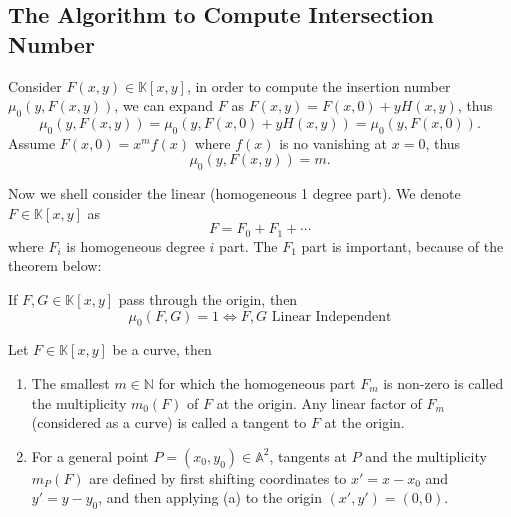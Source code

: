 \documentclass[10pt]{article}
\begin{document}
\subsection{The Algorithm to Compute Intersection Number}

Consider $ F(x,y) \in \mathbb{K}[x,y]$, in order to compute the insertion number $ \mu_{0}(y, F(x,y))$, we can expand $ F$ as $ F(x,y) = F(x,0) + y H(x,y)$, thus
\begin{equation*}
  \mu_{0}(y, F(x,y)) = \mu_{0}(y, F(x,0) + y H(x,y)) = \mu_{0}(y, F(x,0)).
\end{equation*}
Assume $ F(x,0) = x^{m} f(x)$ where $ f(x)$ is no vanishing at $ x=0$, thus
\begin{equation*}
  \mu_{0}(y, F(x,y)) = m.
\end{equation*}

Now we shell consider the linear (homogeneous 1 degree part). We denote $ F \in \mathbb{K}[x,y]$ as
\begin{equation*}
  F = F_0 + F_1 +\cdots
\end{equation*}
where $ F_{i}$ is homogeneous degree $ i$ part. The $ F_{1}$ part is important, because of the theorem below:
\begin{theorem}
  If $ F, G \in \mathbb{K}[x,y]$ pass through the origin, then
  \begin{equation*}
    \mu_{0}(F,G) = 1 \Leftrightarrow F, G \text{ Linear Independent}
  \end{equation*}
\end{theorem}

\begin{definition}
  Let $ F \in \mathbb{K}[x,y]$ be a curve, then
  \begin{enumerate}[(1)]
    \item The smallest \( m \in \mathbb{N} \) for which the homogeneous part \( F_m \) is non-zero is called the multiplicity \( m_0(F) \) of \( F \) at the origin. Any linear factor of \( F_m \) (considered as a curve) is called a tangent to \( F \) at the origin.
    \item For a general point \( P = (x_0, y_0) \in \mathbb{A}^2 \), tangents at \( P \) and the multiplicity \( m_P(F) \) are defined by first shifting coordinates to \( x' = x - x_0 \) and \( y' = y - y_0 \), and then applying (a) to the origin \( (x', y') = (0, 0) \).
  \end{enumerate}
\end{definition}
\end{document}

